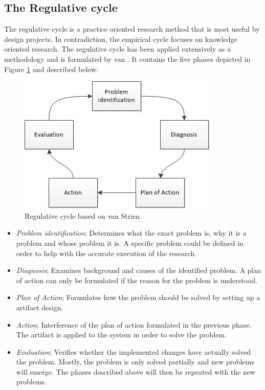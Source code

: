 \subsection{The Regulative cycle} \label{The Regulative Cycle}
The regulative cycle is a practice oriented research method that is most useful by design projects. In contradiction, the empirical cycle focuses on knowledge oriented research. The regulative cycle has been applied extensively as a methodology and is formulated by van \citet{vanStrien1986}. It contains the five phases depicted in Figure \ref{fig:Regulative cycle} and described below:
\begin{figure}[ht]
\centering
\includegraphics[]{Figures/Regulative_Cycle}
\caption[Regulative cycle]{Regulative cycle based on van Strien \parencite{vanStrien1986,vanStrien1997}}
\label{fig:Regulative cycle}
\end{figure}
\begin{itemize}
\item \textit{Problem identification}; Determines what the exact problem is, why it is a problem and whose problem it is. A specific problem could be defined in order to help with the accurate execution of the research.
\item \textit{Diagnosis}; Examines background and causes of the identified problem. A plan of action can only be formulated if the reason for the problem is understood.
\item \textit{Plan of Action}; Formulates how the problem should be solved by setting up a artifact design.
\item \textit{Action}; Interference of the plan of action formulated in the previous phase. The artifact is applied to the system in order to solve the problem.
\item \textit{Evaluation}; Verifies whether the implemented changes have actually solved the problem. Mostly, the problem is only solved partially and new problems will emerge. The phases described above will then be repeated with the new problems.
\end{itemize}

